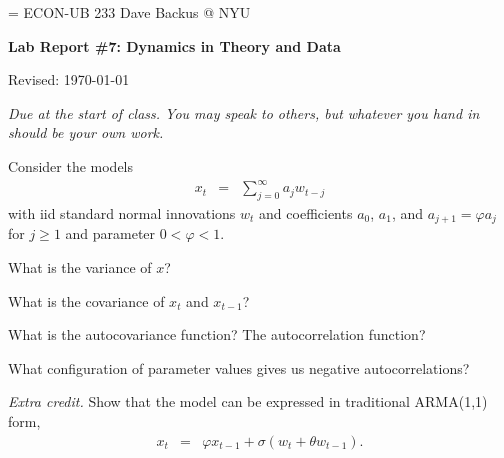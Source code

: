 \documentclass[11pt]{exam}
\begin{document}
\parskip=\bigskipamount
\parindent=0.0in
\thispagestyle{empty}
{\large ECON-UB 233 \hfill Dave Backus @ NYU}

\bigskip\bigskip
\centerline{\Large \bf Lab Report \#7:  Dynamics in Theory and Data}
\centerline{Revised: \today}

\bigskip
{\it Due at the start of class.
You may speak to others, but whatever you hand in should be your own work.
}


\begin{questions}
Consider the models
\begin{eqnarray*}
    x_t &=& \sum_{j=0}^\infty a_j w_{t-j}
\end{eqnarray*}
with iid standard normal innovations $w_t$
and coefficients $a_0$, $a_1$, and $a_{j+1} = \varphi a_j $
for $j \geq 1$ and parameter $0 < \varphi < 1$.
\begin{parts}
\item What is the variance of $x$?
\item What is the covariance of $x_t$ and $x_{t-1}$?
\item What is the autocovariance function?
The autocorrelation function?
\item What configuration of parameter values gives us negative autocorrelations?
\item {\it Extra credit.\/}
Show that the model can be expressed in traditional ARMA(1,1)
form,
\begin{eqnarray*}
    x_t &=& \varphi x_{t-1} + \sigma (w_t + \theta w_{t-1} ) .
\end{eqnarray*}

\end{parts}



\end{questions}
\end{document}
